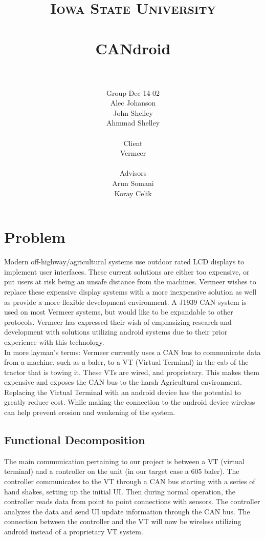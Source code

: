 \documentclass[paper=a4, fontsize=11pt]{scrartcl}
\title{
		\vspace{1in} 	
		\usefont{OT1}{bch}{b}{n}
		\normalfont \normalsize \textsc{Iowa State University} \\ [25pt]
		{\color{darkgreen}\horrule{1pt} \\[0.5cm]}
		\huge CANdroid \\
		{\color{darkgreen}\horrule{1pt} \\[0.5cm]}
		\vspace{1.25in}
}
\author{
		\normalfont 								\normalsize
		{\color{darkgreen} Group Dec 14-02}\\ \normalsize
        Alec Johanson\\[-3pt]		\normalsize
        John Shelley\\[-3pt]		\normalsize
        Ahmmad Shelley\\[-3pt]		\normalsize
		\\ \normalsize
		{\color{darkgreen} Client}\\ \normalsize
		Vermeer \\ \normalsize
		\\ \normalsize
		{\color{darkgreen} Advisors}\\ \normalsize
		Arun Somani \\ \normalsize
		Koray Celik \\ \normalsize
}
\date{}
\numberwithin{equation}{section}		%
\numberwithin{figure}{section}			%
\numberwithin{table}{section}				%
\begin{document}
\maketitle
\pagebreak
\section{Problem}
Modern off-highway/agricultural systems use outdoor rated LCD displays to implement user interfaces. These current solutions are either too expensive, or put users at risk being an unsafe distance from the machines. Vermeer wishes to replace these expensive display systems with a more inexpensive solution as well as provide a more flexible development environment. A J1939 CAN system is used on most Vermeer systems, but would like to be expandable to other protocols. Vermeer has expressed their wish of emphasizing research and development with solutions utilizing android systems due to their prior experience with this technology. \\
	
\noindent In more layman's terms: Vermeer currently uses a CAN bus to communicate data from a machine, such as a baler, to a VT (Virtual Terminal) in the cab of the tractor that is towing it. These VTs are wired, and proprietary. This makes them expensive and exposes the CAN bus to the harsh Agricultural environment. Replacing the Virtual Terminal with an android device has the potential to greatly reduce cost. While making the connection to the android device wireless can help prevent erosion and weakening of the system. \\

\subsection{Functional Decomposition}
The main communication pertaining to our project is between a VT (virtual terminal) and a controller on the unit (in our target case a 605 baler). The controller communicates to the VT through a CAN bus starting with a series of hand shakes, setting up the initial UI. Then during normal operation, the controller reads data from point to point connections with sensors. The controller analyzes the data and send UI update information through the CAN bus. The connection between the controller and the VT will now be wireless utilizing android instead of a proprietary VT system. \\
\end{document}
